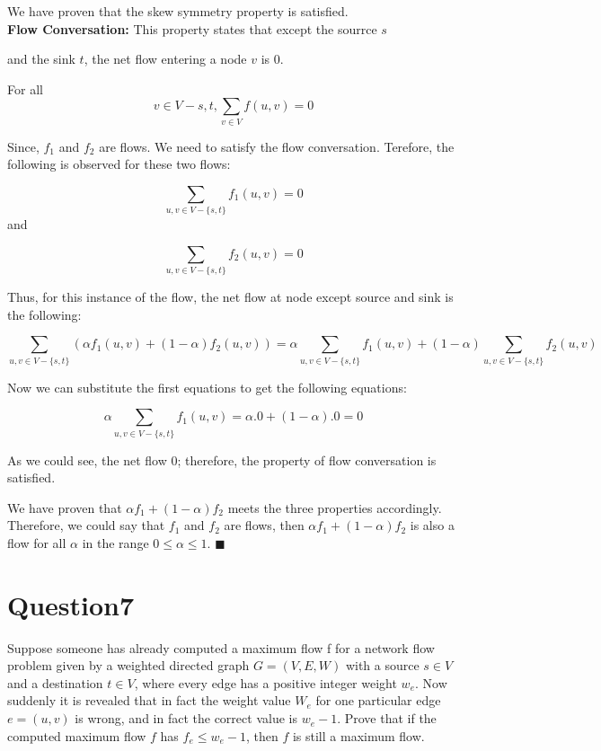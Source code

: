 \documentclass[12]{article}
\begin{document}
We have proven that the skew symmetry property is satisfied. \\


\textbf{Flow Conversation: } This property states that except the sourrce $s$ 

and the sink $t$, the net flow entering a node $v$ is $0$.

For all $$ v \in V - {s,t},\sum_{v \in V }f(u,v) = 0$$

Since, $f_1$ and $f_2$ are flows. We need to satisfy the flow conversation. Terefore, the following is observed for these two flows:

$$ \sum_{u, v \in V - \lbrace s, t \rbrace}f_1(u,v) = 0$$ and

$$ \sum_{u, v \in V - \lbrace s, t \rbrace}f_2(u,v) = 0$$

Thus, for this instance of the flow, the net flow at node except source and sink is the following:

$$ \sum_{u, v \in V - \lbrace s, t \rbrace}(\alpha f_1(u,v) + ( 1 - \alpha )f_2(u,v))  = \alpha \sum_{u, v \in V - \lbrace s, t \rbrace}f_1(u,v) + ( 1 - \alpha) \sum_{u, v \in V - \lbrace s, t \rbrace}f_2(u,v)$$ 

Now we can substitute the first equations to get the following equations:

$$\alpha \sum_{u, v \in V - \lbrace s, t \rbrace}f_1(u,v) = \alpha.0 + ( 1 - \alpha).0 = 0$$

As we could see, the net flow $0$; therefore, the property of flow conversation is satisfied. 

We have proven that $\alpha f_1 + ( 1 - \alpha )f_2$ meets the three properties accordingly. Therefore, we could say that $f_1$ and $f_2$ are flows, then $\alpha f_1 + ( 1 - \alpha )f_2$ is also a flow for all $\alpha$ in the range $0 \leqslant \alpha \leqslant 1$. $\blacksquare$


\section{Question7} 

Suppose someone has already computed a maximum flow f for a network flow problem given by a weighted directed graph $G=(V,E,W)$ with a source $s \in V$ and a destination $t \in V$, where every edge has a positive integer weight $w_e$. Now suddenly it is revealed that in fact the weight value $W_e$ for one particular edge $e = (u,v)$ is wrong, and in fact the correct value is $w_e - 1$. Prove that if the computed maximum flow $f$ has $f_e \leqslant w_e - 1$, then $f$ is still a maximum flow.  \\
\end{document}
